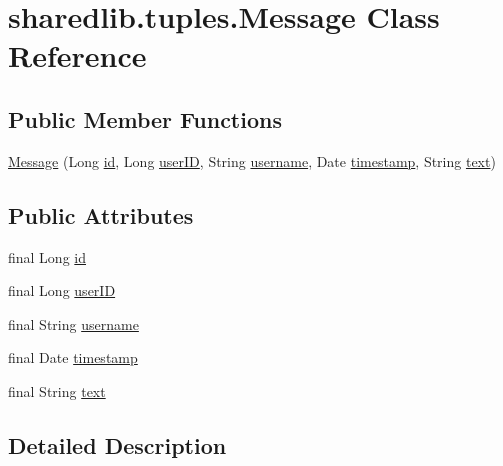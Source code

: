 \hypertarget{classsharedlib_1_1tuples_1_1_message}{}\section{sharedlib.\+tuples.\+Message Class Reference}
\label{classsharedlib_1_1tuples_1_1_message}
\subsection*{Public Member Functions}
\begin{DoxyCompactItemize}
\item 
\hyperlink{classsharedlib_1_1tuples_1_1_message_a6adc6c69ccb5ee797eeb41ed04f7f35a}{Message} (Long \hyperlink{classsharedlib_1_1tuples_1_1_message_a0f04f43067e7ff168c591a1599a533bb}{id}, Long \hyperlink{classsharedlib_1_1tuples_1_1_message_a2cff2bb100c096bd45b4edeb1f305e3f}{user\+ID}, String \hyperlink{classsharedlib_1_1tuples_1_1_message_ada81e5986a0d18e2bee75e4283a9a815}{username}, Date \hyperlink{classsharedlib_1_1tuples_1_1_message_af3abb7c369e9a9ad59808f9a0118f787}{timestamp}, String \hyperlink{classsharedlib_1_1tuples_1_1_message_a3b36d09693c30bf324c5efd91f932eb5}{text})
\end{DoxyCompactItemize}
\subsection*{Public Attributes}
\begin{DoxyCompactItemize}
\item 
final Long \hyperlink{classsharedlib_1_1tuples_1_1_message_a0f04f43067e7ff168c591a1599a533bb}{id}
\item 
final Long \hyperlink{classsharedlib_1_1tuples_1_1_message_a2cff2bb100c096bd45b4edeb1f305e3f}{user\+ID}
\item 
final String \hyperlink{classsharedlib_1_1tuples_1_1_message_ada81e5986a0d18e2bee75e4283a9a815}{username}
\item 
final Date \hyperlink{classsharedlib_1_1tuples_1_1_message_af3abb7c369e9a9ad59808f9a0118f787}{timestamp}
\item 
final String \hyperlink{classsharedlib_1_1tuples_1_1_message_a3b36d09693c30bf324c5efd91f932eb5}{text}
\end{DoxyCompactItemize}


\subsection{Detailed Description}


